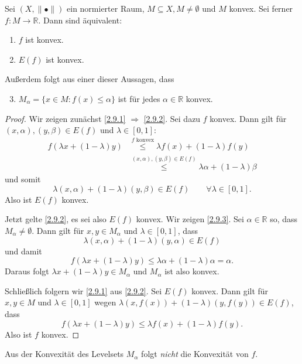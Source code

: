 \documentclass[main.tex]{subfiles}
\begin{document}
\begin{satz}\label{2.9}
Sei $(X, \|•\|)$ ein normierter Raum, $M\subseteq X, M\ne ∅$ und $M$ konvex. Sei ferner $f\colon M\to ℝ.$ Dann sind äquivalent:
\begin{enumerate}[label=(\roman*)]
\item \label{2.9.1} $f$ ist konvex.
\item \label{2.9.2} $E(f)$ ist konvex.
\end{enumerate}
Außerdem folgt aus einer dieser Aussagen, dass
\begin{enumerate}[label=(\roman*)]
\setcounter{enumi}{2}
\item \label{2.9.3} $M_α = \{ x\in M: f(x) \le α \}$ ist für jedes $α\in ℝ$ konvex. 
\end{enumerate}
\end{satz}

\begin{proof}
Wir zeigen zunächst \ref{2.9.1} $\Rightarrow$ \ref{2.9.2}. Sei dazu $f$ konvex. Dann gilt für $(x,α),(y,β)\in E(f)$ und $λ\in [0,1]$:
\begin{align*}
f(λx+ (1-λ) y) &\stackrel{\text{$f$ konvex}}\le λf(x) + (1-λ) f(y)\\
&\stackrel{(x,α), (y,β)\in E(f)}\le λα + (1-λ) β
\end{align*}
und somit 
$$λ(x, α) + (1-λ) (y,β) \in E(f) \qquad ∀λ\in [0,1].$$
Also ist $E(f)$ konvex.

Jetzt gelte \ref{2.9.2}, es sei also $E(f)$ konvex. Wir zeigen \ref{2.9.3}. 
Sei $α\in ℝ$ so, dass $M_α\ne ∅$. Dann gilt für $x,y \in M_α$ und $λ\in [0,1]$, dass
$$λ(x,α) + (1-λ) (y,α)\in E(f)$$
und damit 
$$f(λx + (1-λ) y ) \le λα + (1-λ) α = α.$$
Daraus folgt
$λx + (1-λ) y \in M_α$ und $M_α$ ist also konvex.

Schließlich folgern wir \ref{2.9.1} aus \ref{2.9.2}. Sei $E(f)$ konvex. Dann gilt für $x,y\in M$ und $λ\in [0,1]$ wegen $λ(x,f(x)) + (1-λ) (y,f(y))\in E(f)$, dass
$$f(λx + (1-λ)y) \le λf(x) + (1-λ) f(y).$$
Also ist $f$ konvex.
\end{proof}

\begin{bem*}
Aus der Konvexität des Levelsets $M_α$ folgt \emph{nicht} die Konvexität von $f$.
\end{bem*}
\end{document}
